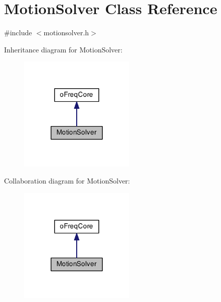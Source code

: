 \hypertarget{class_motion_solver}{\section{Motion\-Solver Class Reference}
\label{class_motion_solver}
}


{\ttfamily \#include $<$motionsolver.\-h$>$}



Inheritance diagram for Motion\-Solver\-:\nopagebreak
\begin{figure}[H]
\begin{center}
\leavevmode
\includegraphics[width=156pt]{class_motion_solver__inherit__graph}
\end{center}
\end{figure}


Collaboration diagram for Motion\-Solver\-:\nopagebreak
\begin{figure}[H]
\begin{center}
\leavevmode
\includegraphics[width=156pt]{class_motion_solver__coll__graph}
\end{center}
\end{figure}
